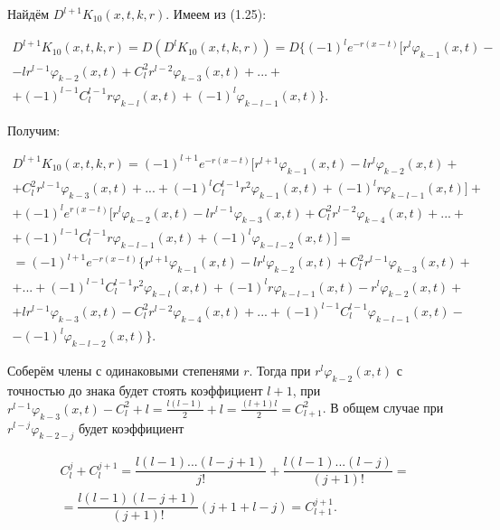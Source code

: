 Найдём $ D^{l+1}K_{10}(x,t,k,r) $. Имеем из (1.25):

\begin{equation}
\begin{array}{c}
\nonumber

D^{l+1}K_{10}(x,t,k,r) = D(D^lK_{10}(x,t,k,r)) = D\lbrace (-1)^le^{-r(x-t)}[r^l\varphi_{k-1}(x,t) - \\
- lr^{l-1}\varphi_{k-2}(x,t) + C_l^2r^{l-2}\varphi_{k-3}(x,t) + ... + \\ + (-1)^{l-1}C_l^{l-1}r\varphi_{k-l}(x,t) + (-1)^l\varphi_{k-l-1}(x,t)\rbrace .

\end{array}
\end{equation}

Получим:

\begin{equation}
\begin{array}{c}
\nonumber

D^{l+1}K_{10}(x,t,k,r) = (-1)^{l+1}e^{-r(x-t)}[r^{l+1}\varphi_{k-1}(x,t) - lr^l\varphi_{k-2}(x,t) + \\ + C_l^2r^{l-1}\varphi_{k-3}(x,t) + ... + (-1)^lC_l^{l-1}r^2\varphi_{k-1}(x,t) + (-1)^lr\varphi_{k-l-1}(x,t)] + \\ + (-1)^le^{r(x-t)}[r^l\varphi_{k-2}(x,t) - lr^{l-1}\varphi_{k-3}(x,t) + C_l^2r^{l-2}\varphi_{k-4}(x,t) + ... + \\ + (-1)^{l-1}C_l^{l-1}r\varphi_{k-l-1}(x,t) + (-1)^l\varphi_{k-l-2}(x,t)] = \\
= (-1)^{l+1}e^{-r(x-t)}\lbrace r^{l+1}\varphi_{k-1}(x,t) - lr^l\varphi_{k-2}(x,t) + C_l^2r^{l-1}\varphi_{k-3}(x,t) + \\ + ... + (-1)^{l-1}C_l^{l-1}r^2\varphi_{k-l}(x,t) + (-1)^lr\varphi_{k-l-1}(x,t) - r^l\varphi_{k-2}(x,t) + \\ + lr^{l-1}\varphi_{k-3}(x,t) - C_l^2r^{l-2}\varphi_{k-4}(x,t) + ... + (-1)^{l-1}C_l^{l-1}\varphi_{k-l-1}(x,t) - \\ - (-1)^l\varphi_{k-l-2}(x,t)\rbrace .

\end{array}
\end{equation}

Соберём члены с одинаковыми степенями $ r $. Тогда при $ r^l\varphi_{k-2}(x,t) $ с точностью до знака будет стоять коэффициент $ l + 1 $, при $ r^{l-1}\varphi_{k-3}(x,t) - C_l^2 + l = \frac{l(l-1)}{2} + l = \frac{(l+1)l}{2} = C_{l+1}^2$.
В общем случае при $ r^{l-j}\varphi_{k-2-j} $ будет коэффициент

\begin{equation}
\begin{array}{c}
\nonumber

C_l^j + C_l^{j+1} = \dfrac{l(l-1)...(l-j+1)}{j!} + \dfrac{l(l-1)...(l-j)}{(j+1)!} = \\
= \dfrac{l(l-1)(l-j+1)}{(j+1)!}(j+1+l-j) = C_{l+1}^{j+1}.

\end{array}
\end{equation}

